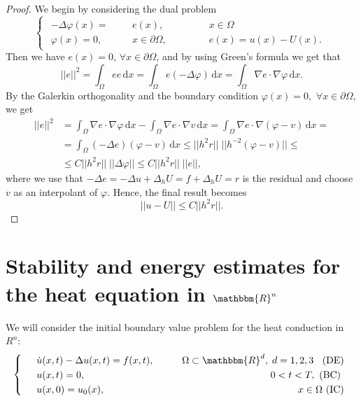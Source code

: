 \documentclass[12pt, a4paper]{article}
\newcommand{\R}{\ensuremath{\mathbbm{R}}}
\newcommand{\rd}{\ensuremath{\mathrm{d}}}
\newcommand{\id}{\ensuremath{\,\rd}}
\numberwithin{equation}{section}
\begin{document}
\begin{proof}
We begin by considering the dual problem
\begin{equation*}
\left\{ \begin{array}{l}
\begin{split}
-\Delta\varphi(x) = &&&e(x), \qquad\quad &&x\in\Omega \\
\varphi(x) = 0, &&&x\in\partial\Omega, &&e(x)=u(x)-U(x).
\end{split}
\end{array}\right.
\end{equation*}
Then we have $e(x) = 0$, $\forall x\in\partial\Omega$, and by using Green's formula we get that
\begin{equation*}
||e||^2 = \int_\Omega ee \id x = \int_\Omega  e(-\Delta \varphi) \id x = \int_\Omega \nabla e \cdot \nabla \varphi \id x.
\end{equation*}
By the Galerkin orthogonality and the boundary condition $\varphi(x) = 0,$ $\forall x\in\partial\Omega$, we get
\begin{equation*}
\begin{split}
||e||^2 &= \int_\Omega \nabla e \cdot \nabla \varphi \id x - \int_\Omega \nabla e \cdot \nabla v\id x = \int_\Omega \nabla e \cdot \nabla (\varphi - v) \id x = \\
&=\int_\Omega (-\Delta e) (\varphi - v)\id x \leq ||h^2 r||\; ||h^{-2}(\varphi - v)|| \leq \\
& \leq C||h^2r||\; ||\Delta \varphi|| \leq C||h^2 r|| \; ||e||,
\end{split}
\end{equation*}
where we use that $-\Delta e = -\Delta u + \Delta_h U = f +\Delta_h U = r$ is the residual and choose $v$ as an interpolant of $\varphi$. Hence, the final result becomes
\begin{equation*}
||u-U|| \leq C||h^2 r||.
\end{equation*}
\end{proof}
\section{Stability and energy estimates for the heat equation in $\R^n$}
We will consider the initial boundary value problem for the heat conduction in $R^n$:
\begin{equation}
\label{heatR}
\left\{ \begin{array}{l}
\begin{split}
&&&\dot{u}(x,t) - \Delta u(x,t) = f(x,t), \qquad &\Omega\subset\R^d,\; d=1,2,3 \;\; \text{ (DE)} \\
&&&u(x,t) = 0, &0<t<T, \text{ (BC) } \\
&&&u(x,0)=u_0(x), & x\in\Omega \text{ (IC)}
\end{split}
\end{array}\right.
\end{equation}
\end{document}
